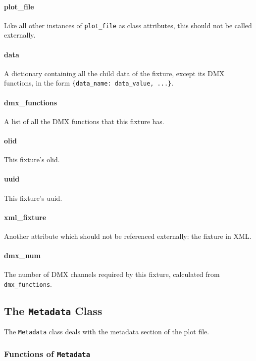 \documentclass[a4paper]{article}
\begin{document}
\paragraph{plot\_file}
Like all other instances of \texttt{plot\_file} as class attributes, this 
should not be called externally.

\paragraph{data}
A dictionary containing all the child data of the fixture, except its DMX 
functions, in the form \texttt{\{data\_name: data\_value, ...\}}.

\paragraph{dmx\_functions}
A list of all the DMX functions that this fixture has.

\paragraph{olid}
This fixture's olid.

\paragraph{uuid}
This fixture's uuid.

\paragraph{xml\_fixture}
Another attribute which should not be referenced externally: the fixture in 
XML.

\paragraph{dmx\_num}
The number of DMX channels required by this fixture, calculated from 
\texttt{dmx\_functions}.

\subsection{The \texttt{Metadata} Class}
The \texttt{Metadata} class deals with the metadata section of the plot file.

\subsubsection{Functions of \texttt{Metadata}}
\end{document}
